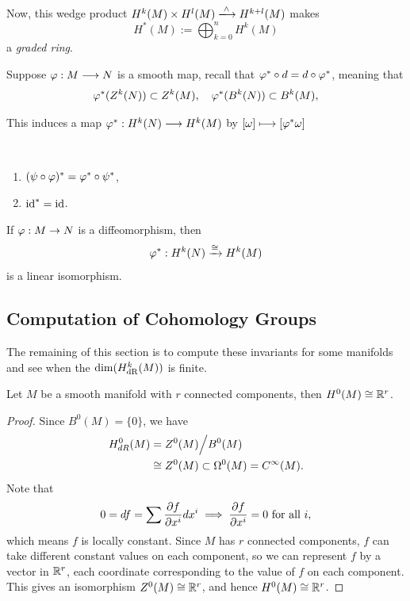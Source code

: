 Now, this wedge product \(H^k(M)\times H^l(M)\xlongrightarrow{\wed} H^{k+l}(M)\) makes \[
    H^*(M) := \bigoplus_{k=0}^n H^k(M)
\] a \emph{graded ring}.

Suppose \(\varphi:M\longrightarrow N\) is a smooth map, recall that \(\varphi^*\circ d = d\circ\varphi^*\), meaning that \[
    \varphi^*(Z^k(N))\subset Z^k(M),\quad \varphi^*(B^k(N))\subset B^k(M),
\]

This induces a map \(\varphi^*:H^k(N)\longrightarrow H^k(M)\) by \([\omega]\longmapsto [\varphi^*\omega]\)

\begin{lemma}\
    \begin{enumerate}
        \item \((\psi\circ\varphi)^* = \varphi^*\circ\psi^*\),
        \item \(\mathrm{id}^* = \mathrm{id}\).
    \end{enumerate}
\end{lemma}

\begin{theorem}
    If \(\varphi:M\to N\) is a diffeomorphism, then \[
        \varphi^*:H^k(N)\xrightarrow{\cong} H^k(M)
    \] is a linear isomorphism.
\end{theorem}

\subsection*{Computation of Cohomology Groups}

The remaining of this section is to compute these invariants for some manifolds and see when the \(\dim(H_{\mathrm{dR}}^k(M))\) is finite.

\begin{proposition}\label{prop:H0_conn_comp}
    Let \(M\) be a smooth manifold with \(r\) connected components, then \(H^0(M)\cong \mathbb{R}^r\).
\end{proposition}
\begin{proof}
    Since \(B^0(M) = \{0\}\), we have \begin{align*}
        H_{dR}^0(M) &= Z^0(M) \Big/ B^0(M) \\
        &\cong Z^0(M) \subset \Omega^0(M) = C^\infty(M).
    \end{align*}
    Note that
    \[
        0 = df = \sum \frac{\partial f}{\partial x^i}dx^i
        \implies \frac{\partial f}{\partial x^i} = 0 \text{ for all } i,
    \]
    which means \(f\) is locally constant. Since \(M\) has \(r\) connected components, \(f\) can take different constant values on each component, so we can represent \(f\) by a vector in \(\mathbb{R}^r\), each coordinate corresponding to the value of \(f\) on each component. This gives an isomorphism \(Z^0(M)\cong \mathbb{R}^r\), and hence \(H^0(M)\cong \mathbb{R}^r\).
\end{proof}

